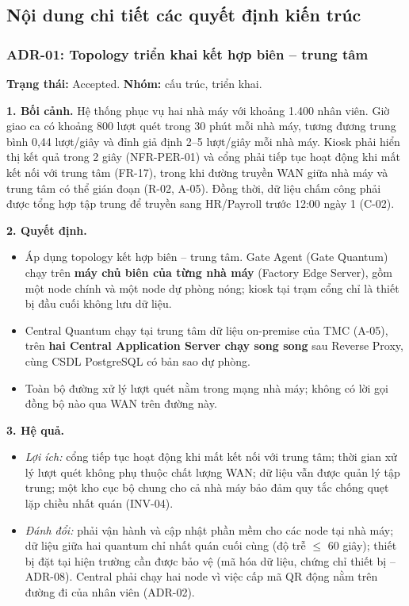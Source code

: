 \subsection{Nội dung chi tiết các quyết định kiến trúc}

\subsubsection{ADR-01: Topology triển khai kết hợp biên -- trung tâm}\label{adr:01}
\textbf{Trạng thái:} Accepted. \textbf{Nhóm:} cấu trúc, triển khai.

\noindent\textbf{1. Bối cảnh.} Hệ thống phục vụ hai nhà máy với khoảng 1.400 nhân viên. Giờ giao ca có khoảng 800 lượt quét trong 30 phút mỗi nhà máy, tương đương trung bình 0,44 lượt/giây và đỉnh giả định 2--5 lượt/giây mỗi nhà máy. Kiosk phải hiển thị kết quả trong 2 giây (NFR-PER-01) và cổng phải tiếp tục hoạt động khi mất kết nối với trung tâm (FR-17), trong khi đường truyền WAN giữa nhà máy và trung tâm có thể gián đoạn (R-02, A-05). Đồng thời, dữ liệu chấm công phải được tổng hợp tập trung để truyền sang HR/Payroll trước 12:00 ngày 1 (C-02).

\noindent\textbf{2. Quyết định.}
\begin{itemize}
    \item Áp dụng topology kết hợp biên -- trung tâm. Gate Agent (Gate Quantum) chạy trên \textbf{máy chủ biên của từng nhà máy} (Factory Edge Server), gồm một node chính và một node dự phòng nóng; kiosk tại trạm cổng chỉ là thiết bị đầu cuối không lưu dữ liệu.
    \item Central Quantum chạy tại trung tâm dữ liệu on-premise của TMC (A-05), trên \textbf{hai Central Application Server chạy song song} sau Reverse Proxy, cùng CSDL PostgreSQL có bản sao dự phòng.
    \item Toàn bộ đường xử lý lượt quét nằm trong mạng nhà máy; không có lời gọi đồng bộ nào qua WAN trên đường này.
\end{itemize}

\noindent\textbf{3. Hệ quả.}
\begin{itemize}
    \item \textit{Lợi ích:} cổng tiếp tục hoạt động khi mất kết nối với trung tâm; thời gian xử lý lượt quét không phụ thuộc chất lượng WAN; dữ liệu vẫn được quản lý tập trung; một kho cục bộ chung cho cả nhà máy bảo đảm quy tắc chống quẹt lặp chiều nhất quán (INV-04).
    \item \textit{Đánh đổi:} phải vận hành và cập nhật phần mềm cho các node tại nhà máy; dữ liệu giữa hai quantum chỉ nhất quán cuối cùng (độ trễ $\le$ 60 giây); thiết bị đặt tại hiện trường cần được bảo vệ (mã hóa dữ liệu, chứng chỉ thiết bị -- ADR-08). Central phải chạy hai node vì việc cấp mã QR động nằm trên đường đi của nhân viên (ADR-02).
\end{itemize}

